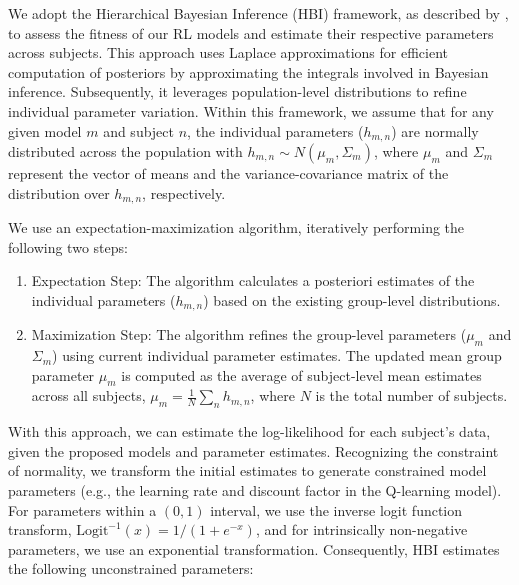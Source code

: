 \documentclass[
  number,
  preprint,
  3p,
  onecolumn]{elsarticle}
\providecommand{\tightlist}{%
  \setlength{\itemsep}{0pt}\setlength{\parskip}{0pt}}\usepackage{longtable,booktabs,array}
\begin{document}
We adopt the Hierarchical Bayesian Inference (HBI) framework, as
described by \citep{piray2019a}, to assess the fitness of our RL models
and estimate their respective parameters across subjects. This approach
uses Laplace approximations for efficient computation of posteriors by
approximating the integrals involved in Bayesian inference.
Subsequently, it leverages population-level distributions to refine
individual parameter variation. Within this framework, we assume that
for any given model \(m\) and subject \(n\), the individual parameters
(\(h_{m,n}\)) are normally distributed across the population with
\(h_{m,n} \sim N(\mu_m, \Sigma_m)\), where \(\mu_m\) and \(\Sigma_m\)
represent the vector of means and the variance-covariance matrix of the
distribution over \(h_{m,n}\), respectively.

We use an expectation-maximization algorithm, iteratively performing the
following two steps:

\begin{enumerate}
\def\labelenumi{\arabic{enumi}.}
\tightlist
\item
  Expectation Step: The algorithm calculates a posteriori estimates of
  the individual parameters (\(h_{m,n}\)) based on the existing
  group-level distributions.
\item
  Maximization Step: The algorithm refines the group-level parameters
  (\(\mu_m\) and \(\Sigma_m\)) using current individual parameter
  estimates. The updated mean group parameter \(\mu_m\) is computed as
  the average of subject-level mean estimates across all subjects,
  \(\mu_m = \frac{1}{N}\sum_{n}h_{m,n}\), where \(N\) is the total
  number of subjects.
\end{enumerate}

With this approach, we can estimate the log-likelihood for each
subject's data, given the proposed models and parameter estimates.
Recognizing the constraint of normality, we transform the initial
estimates to generate constrained model parameters (e.g., the learning
rate and discount factor in the Q-learning model). For parameters within
a \((0,1)\) interval, we use the inverse logit function transform,
\(\text{Logit}^{-1}(x)=1/(1+e^{-x})\), and for intrinsically
non-negative parameters, we use an exponential transformation.
Consequently, HBI estimates the following unconstrained parameters:
\end{document}
